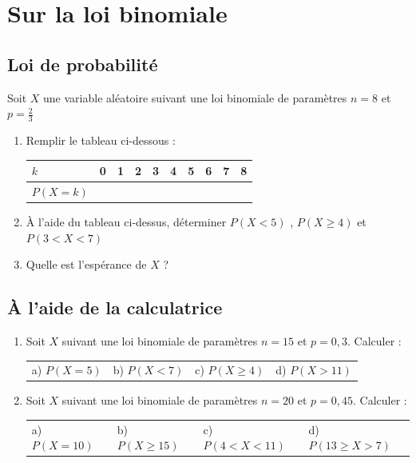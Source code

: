 \documentclass[oneside,12pt]{article}          %
\begin{document}
\section{Sur la loi binomiale}

\subsection{Loi de probabilité}
Soit $X$ une variable aléatoire suivant une loi binomiale de paramètres $n=8$ et $p=\frac{2}{3}$

\begin{enumerate}
    \item Remplir le tableau ci-dessous :
    \begin{center}
    \renewcommand{\arraystretch}{1.5}
    \hspace{-1cm}
    \begin{tabular}{|P{2cm}|P{12mm}|P{12mm}|P{12mm}|P{12mm}|P{12mm}|P{12mm}|P{12mm}|P{12mm}|P{12mm}|} \hline
    $k$ & 0 & 1 & 2 & 3 & 4 & 5 & 6 & 7 & 8 \\ \hline
    $P(X=k)$ & & & & & & & & & \\ \hline 
    \end{tabular}
    \end{center}
    \item À l'aide du tableau ci-dessus, déterminer $P(X<5)$ , $P(X\geq4)$ et $P(3<X<7)$
    \item Quelle est l'espérance de $X$ ?
\end{enumerate}



\subsection{À l'aide de la calculatrice}
\begin{enumerate}
    \item Soit $X$ suivant une loi binomiale de paramètres $n=15$ et $p=0,3$. Calculer :\\
    \begin{tabular}{p{} p{} p{} p{}}
        a) $P(X=5)$ & b) $P(X<7)$ & c) $P(X\geq4)$ & d) $P(X>11)$ 
    \end{tabular}
    \item Soit $X$ suivant une loi binomiale de paramètres $n=20$ et $p=0,45$. Calculer :\\    
    \begin{tabular}{p{} p{} p{} p{}}
        a) $P(X=10)$ & b) $P(X\geq15)$ & c) $P(4<X<11)$ & d) $P(13\geq X>7)$ 
    \end{tabular}
\end{enumerate}
\end{document}
